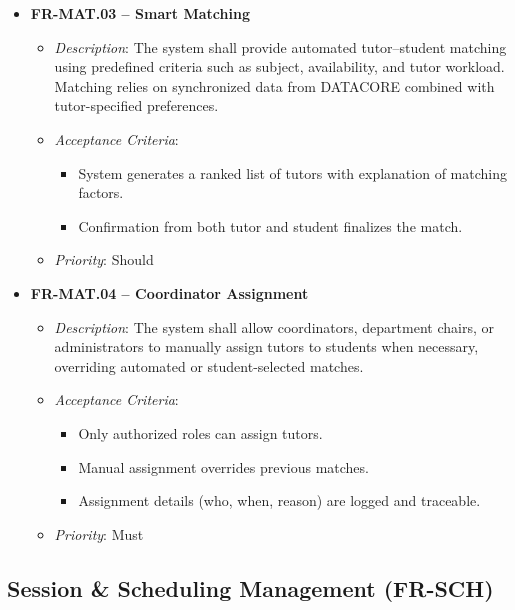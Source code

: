 \begin{itemize}
    \item \textbf{FR-MAT.03 – Smart Matching}
        \begin{itemize}
            \item \textit{Description}: The system shall provide automated tutor–student matching using predefined criteria such as subject, availability, and tutor workload. Matching relies on synchronized data from DATACORE combined with tutor-specified preferences.
            \item \textit{Acceptance Criteria}:
                \begin{itemize}
                    \item System generates a ranked list of tutors with explanation of matching factors.
                    \item Confirmation from both tutor and student finalizes the match.
                \end{itemize}      
            \item \textit{Priority}: Should
        \end{itemize}
    
\item \textbf{FR-MAT.04 – Coordinator Assignment}
    \begin{itemize}
        \item \textit{Description}: The system shall allow coordinators, department chairs, or administrators to manually assign tutors to students when necessary, overriding automated or student-selected matches.
        \item \textit{Acceptance Criteria}:
            \begin{itemize}
                \item Only authorized roles can assign tutors.
                \item Manual assignment overrides previous matches.
                \item Assignment details (who, when, reason) are logged and traceable.
            \end{itemize}      
        \item \textit{Priority}: Must
    \end{itemize}
   

\end{itemize}

\subsection{Session \& Scheduling Management (FR-SCH)}

